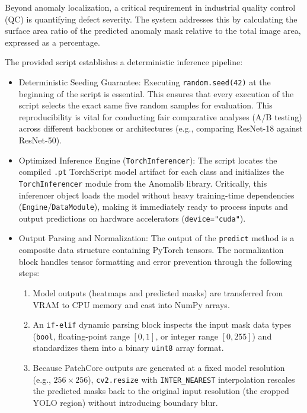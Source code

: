 \documentclass{article}
\begin{document}
Beyond anomaly localization, a critical requirement in industrial quality control (QC) is quantifying defect severity. The system addresses this by calculating the surface area ratio of the predicted anomaly mask relative to the total image area, expressed as a percentage.

The provided script establishes a deterministic inference pipeline:

\begin{itemize}
	\item Deterministic Seeding Guarantee:
	Executing \texttt{random.seed(42)} at the beginning of the script is essential. This ensures that every execution of the script selects the exact same five random samples for evaluation. This reproducibility is vital for conducting fair comparative analyses (A/B testing) across different backbones or architectures (e.g., comparing ResNet-18 against ResNet-50).
	
	\item Optimized Inference Engine (\texttt{TorchInferencer}):
	The script locates the compiled \texttt{.pt} TorchScript model artifact for each class and initializes the \texttt{TorchInferencer} module from the Anomalib library. Critically, this inferencer object loads the model without heavy training-time dependencies (\texttt{Engine}/\texttt{DataModule}), making it immediately ready to process inputs and output predictions on hardware accelerators (\texttt{device="cuda"}).
	
	\item Output Parsing and Normalization:
	The output of the \texttt{predict} method is a composite data structure containing PyTorch tensors. The normalization block handles tensor formatting and error prevention through the following steps:
	\begin{enumerate}
		\item Model outputs (heatmaps and predicted masks) are transferred from VRAM to CPU memory and cast into NumPy arrays.
		\item An \texttt{if-elif} dynamic parsing block inspects the input mask data types (\texttt{bool}, floating-point range $[0, 1]$, or integer range $[0, 255]$) and standardizes them into a binary \texttt{uint8} array format.
		\item Because PatchCore outputs are generated at a fixed model resolution (e.g., $256 \times 256$), \texttt{cv2.resize} with \texttt{INTER\_NEAREST} interpolation rescales the predicted masks back to the original input resolution (the cropped YOLO region) without introducing boundary blur.
	\end{enumerate}
	

\end{itemize}
\end{document}
